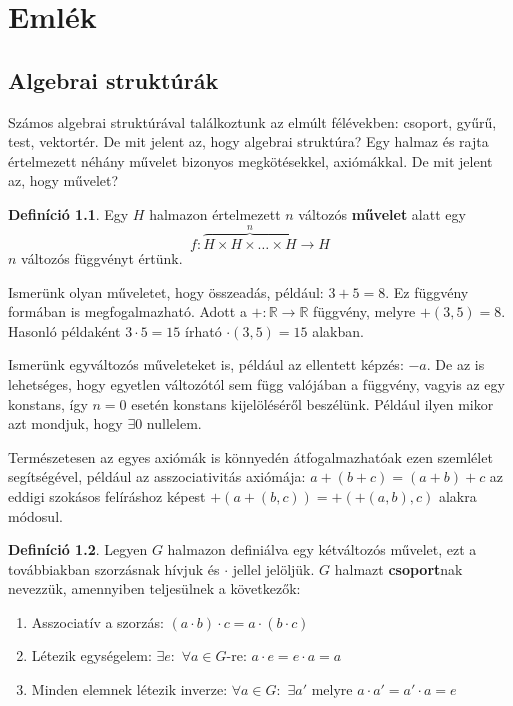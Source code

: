 \documentclass[12pt]{book}
\theoremstyle{plain} %
\theoremstyle{definition} %
\newtheorem{defi/}{Definíció}[section]
\newenvironment{defi}
  {\renewcommand{\qedsymbol}{$\clubsuit$}%
   \pushQED{\qed}\begin{defi/}}
  {\popQED\end{defi/}}
\theoremstyle{remark}
\renewcommand\qedsymbol{$\blacksquare$}
\numberwithin{equation}{section}  %
\renewcommand{\chaptermark}[1]{\markboth{\thechapter.\ \MakeUppercase{#1}}{}} %
\def\R{\mathbb{R}}
\begin{document}
	\chapter{Emlék}
	\pagestyle{fancy}
	\renewcommand{\chaptermark}[1]{\markboth{\thechapter.\ \MakeUppercase{#1}}{}} %
	\fancyhf{}
	\fancyhead[LE]{\thepage}
	\fancyhead[RO]{\thepage}
	\fancyhead[LO]{\rightmark}
	\fancyhead[RE]{\leftmark}
	
	\section{Algebrai struktúrák}
	Számos algebrai struktúrával találkoztunk az elmúlt félévekben: csoport, gyűrű, test, vektortér. De mit jelent az, hogy algebrai struktúra? Egy halmaz és rajta értelmezett néhány művelet bizonyos megkötésekkel, axiómákkal. De mit jelent az, hogy művelet?
	
	\begin{defi}
		Egy $H$ halmazon értelmezett $n$ változós \textbf{művelet} alatt egy
		\[  f: \overbrace{H\times H \times \ldots \times H}^{n} \to H \]
		$n$ változós függvényt értünk.
	\end{defi}

	Ismerünk olyan műveletet, hogy összeadás, például: $3+5=8$. Ez függvény formában is megfogalmazható. Adott a $+:\R \to \R$ függvény, melyre $+(3,5)=8$. Hasonló példaként $3\cdot 5 = 15$ írható $\cdot(3,5) = 15$ alakban.
	
	Ismerünk egyváltozós műveleteket is, például az ellentett képzés: $-a$. De az is lehetséges, hogy egyetlen változótól sem függ valójában a függvény, vagyis az egy konstans, így $n=0$ esetén konstans kijelöléséről beszélünk. Például ilyen mikor azt mondjuk, hogy $\exists 0$ nullelem.
	
	Természetesen az egyes axiómák is könnyedén átfogalmazhatóak ezen szemlélet segítségével, például az asszociativitás axiómája: $a+(b+c)=(a+b)+c$ az eddigi szokásos felíráshoz képest $+(a+(b,c)) = +(+(a,b),c)$ alakra módosul. 
	
	\begin{defi}
		Legyen $G$ halmazon definiálva egy kétváltozós művelet, ezt a továbbiakban szorzásnak hívjuk és $\cdot$ jellel jelöljük. $G$ halmazt \textbf{csoport}nak nevezzük, amennyiben teljesülnek a következők:
		\begin{enumerate}
			\item{Asszociatív a szorzás: $(a\cdot b)\cdot c = a \cdot (b\cdot c)$}
			\item{Létezik egységelem: $\exists e:$ $\forall a\in G$-re: $a\cdot e=e\cdot a = a$}
			\item{Minden elemnek létezik inverze: $\forall a\in G:$ $\exists a'$ melyre  $a\cdot a' = a'\cdot a = e$}
		\end{enumerate}
	\end{defi}
\end{document}
